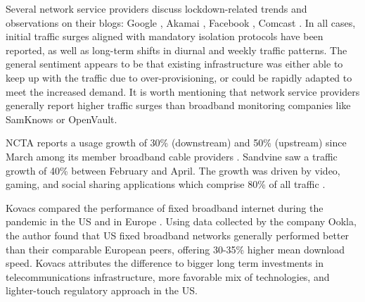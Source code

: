\documentclass[conference,10pt]{IEEEtran}
\begin{document}
Several network service providers discuss lockdown-related trends and observations on their blogs: Google \cite{google}, Akamai \cite{akamai}, Facebook \cite{facebook}, Comcast \cite{comcast}. In all cases, initial traffic surges aligned with mandatory isolation protocols have been reported, as well as long-term shifts in diurnal and weekly traffic patterns. The general sentiment appears to be that existing infrastructure was either able to keep up with the traffic due to over-provisioning, or could be rapidly adapted to meet the increased demand. It is worth mentioning that network service providers generally report higher traffic surges than broadband monitoring companies like SamKnows or OpenVault.

NCTA reports a usage growth of 30\% (downstream) and 50\% (upstream) since March among its member broadband cable providers \cite{ncta}. Sandvine saw a traffic growth of 40\% between February and April. The growth was driven by video, gaming, and social sharing applications which comprise 80\% of all traffic \cite{sandvine}.

Kovacs compared the performance of fixed broadband internet during the pandemic in the US and in Europe \cite{kovacs}. Using data collected by the company Ookla, the author found that US fixed broadband networks generally performed better than their comparable European peers, offering 30-35\% higher mean download speed. Kovacs attributes the difference to bigger long term investments in telecommunications infrastructure, more favorable mix of technologies, and lighter-touch regulatory approach in the US.


\end{document}
